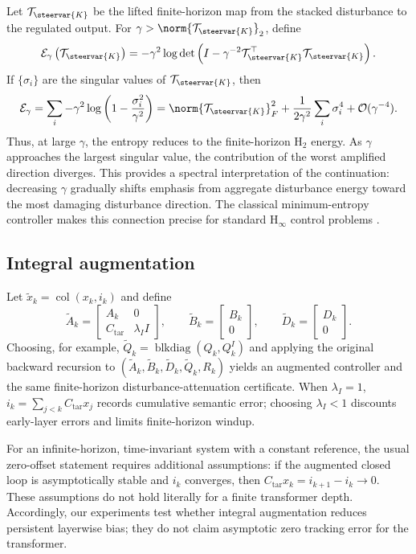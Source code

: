 Let $\mathcal{T}_{\steervar{K}}$ be the lifted finite-horizon map from the
stacked disturbance to the regulated output.  For
$\gamma>\norm{\mathcal{T}_{\steervar{K}}}_2$, define
$$
\mathcal{E}_\gamma
\left(\mathcal{T}_{\steervar{K}}\right)
=
-\gamma^2
\log\det\left(
I-\gamma^{-2}
\mathcal{T}_{\steervar{K}}^\top
\mathcal{T}_{\steervar{K}}
\right).
$$
If $\{\sigma_i\}$ are the singular values of
$\mathcal{T}_{\steervar{K}}$, then
$$
\mathcal{E}_\gamma
=
\sum_i
-\gamma^2\log\left(1-\frac{\sigma_i^2}{\gamma^2}\right)
=
\norm{\mathcal{T}_{\steervar{K}}}_F^2
+
\frac{1}{2\gamma^2}\sum_i\sigma_i^4
+
\mathcal{O}(\gamma^{-4}).
$$
Thus, at large $\gamma$, the entropy reduces to the finite-horizon
$\mathrm{H}_2$ energy.  As $\gamma$ approaches the largest singular value,
the contribution of the worst amplified direction diverges.  This provides a
spectral interpretation of the continuation: decreasing $\gamma$ gradually
shifts emphasis from aggregate disturbance energy toward the most damaging
disturbance direction.  The classical minimum-entropy controller makes this
connection precise for standard $\mathrm{H}_{\infty}$ control problems
\citep{doyle1989state,iglesias1990discrete}.

\subsection{Integral augmentation}
\label{app:integral-steering}

Let
$\tilde{x}_k=\operatorname{col}(x_k,i_k)$ and define
$$
\tilde A_k
=
\begin{bmatrix}
A_k&0\\C_{\mathrm{tar}}&\lambda_I I
\end{bmatrix},
\qquad
\tilde B_k
=
\begin{bmatrix}B_k\\0\end{bmatrix},
\qquad
\tilde D_k
=
\begin{bmatrix}D_k\\0\end{bmatrix}.
$$
Choosing, for example,
$\tilde Q_k=\operatorname{blkdiag}(Q_k,Q_k^I)$ and applying the original
backward recursion to
$(\tilde A_k,\tilde B_k,\tilde D_k,\tilde Q_k,R_k)$ yields an augmented
controller and the same finite-horizon disturbance-attenuation certificate.
When $\lambda_I=1$,
$i_k=\sum_{j<k}C_{\mathrm{tar}}x_j$ records cumulative semantic error; choosing
$\lambda_I<1$ discounts early-layer errors and limits finite-horizon windup.

For an infinite-horizon, time-invariant system with a constant reference, the
usual zero-offset statement requires additional assumptions: if the augmented
closed loop is asymptotically stable and $i_k$ converges, then
$C_{\mathrm{tar}}x_k=i_{k+1}-i_k\rightarrow0$.  These assumptions do not hold
literally for a finite transformer depth.  Accordingly, our experiments test
whether integral augmentation reduces persistent layerwise bias; they do not
claim asymptotic zero tracking error for the transformer.
